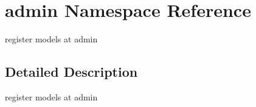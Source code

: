 \hypertarget{namespaceadmin}{}\section{admin Namespace Reference}
\label{namespaceadmin}


register models at admin  




\subsection{Detailed Description}
register models at admin 